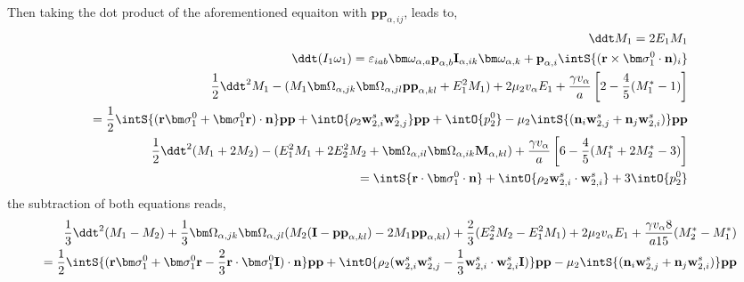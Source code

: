 Then taking the dot product of the aforementioned equaiton with $\textbf{pp}_{\alpha,ij}$, leads to, 
\begin{align*}
    \ddt M_1
    = 2E_1M_1\\
    \ddt (I_1 \omega_1)
    = 
    \varepsilon_{iab}\bm\omega_{\alpha,a}\textbf{p}_{\alpha,b}\textbf{I}_{\alpha,ik}\bm\omega_{\alpha,k}
    + \textbf{p}_{\alpha,i} \intS{(\textbf{r}\times\bm\sigma_1^0\cdot \textbf{n})_i} \\
    \frac{1}{2}\ddt^2 M_1
    - (M_1  
     \bm\Omega_{\alpha,jk}
     \bm\Omega_{\alpha,jl}
    \textbf{pp}_{\alpha,kl}
    + E_1^2 M_1  )
    + 2 \mu_2 v_\alpha E_1
    + \frac{\gamma v_\alpha }{a} \left[
    2
    - \frac{4 }{5} (M_1^* - 1)
    \right]\\
    = 
    \frac{1}{2}\intS{(\textbf{r}\bm\sigma_1^0 + \bm\sigma_1^0\textbf{r})\cdot \textbf{n}} \textbf{pp}
    + \intO{\rho_2 \textbf{w}_{2,i}^s\textbf{w}_{2,j}^s} \textbf{pp}
    + \intO{p_2^0} 
    - \mu_2 \intS{(\textbf{n}_i \textbf{w}_{2,j}^s + \textbf{n}_j \textbf{w}_{2,i}^s)} \textbf{pp}\\
    \frac{1}{2}\ddt^2 (M_1 + 2M_2)
    -  ( E_1^2M_1
    +2E_2^2M_2
    + 
    \bm\Omega_{\alpha,il}
    \bm\Omega_{\alpha,ik}
    \textbf{M}_{\alpha,kl})  
    + \frac{\gamma v_\alpha }{a} \left[
    6
    - \frac{4 }{5 } (M_1^*+2M_2^* - 3)
    \right]\\
    = 
    \intS{\textbf{r}\cdot\bm\sigma_1^0\cdot \textbf{n}} 
    + \intO{\rho_2 \textbf{w}_{2,i}^s\cdot \textbf{w}_{2,i}^s}
    + 3 \intO{p_2^0} 
\end{align*}
the subtraction of both equations reads, 
\begin{align*}
    \frac{1}{3}\ddt^2 (M_1 - M_2)
    +  
    \frac{1}{3}\bm\Omega_{\alpha,jk}
    \bm\Omega_{\alpha,jl}(
        M_2(\textbf{I} - \textbf{pp}_{\alpha,kl})
        - 2
        M_1\textbf{pp}_{\alpha,kl}
    )
    + \frac{2}{3} (E_2^2 M_2 - E_1^2 M_1 )
    + 2 \mu_2 v_\alpha E_1
    + \frac{\gamma v_\alpha 8 }{a15} (M_2^* - M_1^*)
    \\ 
    = 
    \frac{1}{2}\intS{(\textbf{r}\bm\sigma_1^0 + \bm\sigma_1^0\textbf{r} - \frac{2}{3}\textbf{r}\cdot \bm\sigma_1^0 \textbf{I})\cdot \textbf{n}} \textbf{pp}
    + \intO{\rho_2 (\textbf{w}_{2,i}^s\textbf{w}_{2,j}^s - \frac{1}{3}\textbf{w}_{2,i}^s\cdot \textbf{w}_{2,i}^s \textbf{I})} \textbf{pp}
    - \mu_2 \intS{(\textbf{n}_i \textbf{w}_{2,j}^s + \textbf{n}_j \textbf{w}_{2,i}^s)} \textbf{pp}\\
\end{align*}
